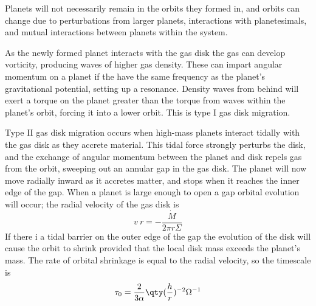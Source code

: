 Planets will not necessarily remain in the orbits they formed in, and
orbits can change due to perturbations from larger planets,
interactions with planetesimals, and mutual interactions between
planets within the system.

As the newly formed planet interacts with the gas disk the gas can
develop vorticity, producing waves of higher gas density. These can
impart angular momentum on a planet if the have the same frequency as
the planet's gravitational potential, setting up a resonance. Density
waves from behind will exert a torque on the planet greater than the
torque from waves within the planet's orbit, forcing it into a lower
orbit. This is type I gas disk migration.

Type II gas disk migration occurs when high-mass planets interact
tidally with the gas disk as they accrete material. This tidal force
strongly perturbs the disk, and the exchange of angular momentum
between the planet and disk repels gas from the orbit, sweeping out an
annular gap in the gas disk. The planet will now move radially inward
as it accretes matter, and stops when it reaches the inner edge of the
gap. When a planet is large enough to open a gap orbital evolution
will occur; the radial velocity of the gas disk is
\[ v~r = -\frac{\dot{M}}{2 \pi r \Sigma} \] If there i a tidal barrier
on the outer edge of the gap the evolution of the disk will cause the
orbit to shrink provided that the local disk mass exceeds the planet's
mass. The rate of orbital shrinkage is equal to the radial velocity,
so the timescale is
\begin{equation}
  \label{eq:51}
  \tau_0 = \frac{2}{3 \alpha} \qty( \frac{h}{r} )^{-2} \Omega^{-1}
\end{equation}


